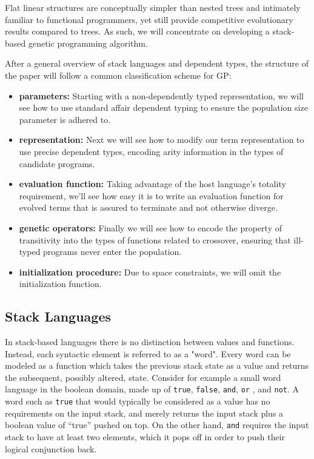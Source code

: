\documentclass{acm_proc_article-sp}
\begin{document}
Flat linear structures are conceptually simpler than nested trees and
intimately familiar to functional programmers, yet still provide
competitive evolutionary results \cite{tchernev:crossmethods} compared
to trees. As such, we will concentrate on developing a stack-based
genetic programming algorithm.

After a general overview of stack languages and dependent types, the
structure of the paper will follow a common classification scheme for
GP:
\begin{itemize}
\item{\textbf{parameters:}} Starting with a non-dependently typed
  representation, we will see how to use standard affair dependent
  typing to ensure the population size parameter is adhered to.
\item{\textbf{representation:}} Next we will see how to modify our
  term representation to use precise dependent types, encoding arity
  information in the types of candidate programs.
\item{\textbf{evaluation function:}} Taking advantage of the host
  language's totality requirement, we'll see how easy it is to write
  an evaluation function for evolved terms that is assured to
  terminate and not otherwise diverge.
\item{\textbf{genetic operators:}} Finally we will see how to encode
  the property of transitivity into the types of functions related to
  crossover, ensuring that ill-typed programs never enter the
  population.
\item{\textbf{initialization procedure:}} Due to space constraints, we
  will omit the initialization function.
\end{itemize}

\subsection{Stack Languages}

In stack-based languages \cite{kelly:forth} there is no
distinction between values and functions. Instead, each syntactic
element is referred to as a "word". Every word can be modeled as a
function which takes the previous stack state as a value and returns
the subsequent, possibly altered, state. Consider for example a
small word language in the boolean domain, made up of \texttt{true},
\texttt{false}, \texttt{and}, \texttt{or} , and \texttt{not}. A word
such as \texttt{true} that would typically be considered as a value
has no requirements on the input stack, and merely returns the input
stack plus a boolean value of ``true'' pushed on top. On the other
hand, \texttt{and} requires the input stack to have at least two elements,
which it pops off in order to push their logical conjunction
back.
\end{document}
